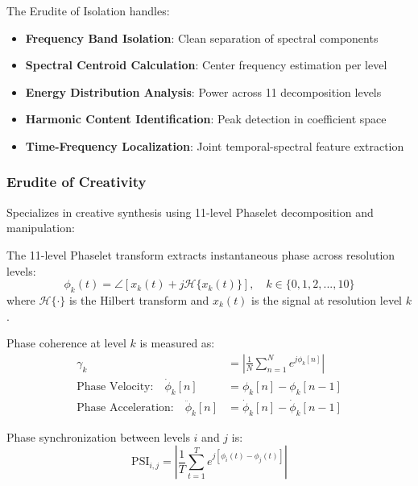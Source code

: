 The Erudite of Isolation handles:
\begin{itemize}
    \item \textbf{Frequency Band Isolation}: Clean separation of spectral components
    \item \textbf{Spectral Centroid Calculation}: Center frequency estimation per level
    \item \textbf{Energy Distribution Analysis}: Power across 11 decomposition levels
    \item \textbf{Harmonic Content Identification}: Peak detection in coefficient space
    \item \textbf{Time-Frequency Localization}: Joint temporal-spectral feature extraction
\end{itemize}

\subsubsection{Erudite of Creativity}
Specializes in creative synthesis using 11-level Phaselet decomposition and manipulation:

\begin{definition}
The 11-level Phaselet transform extracts instantaneous phase across resolution levels:
\begin{equation}
\phi_k(t) = \angle[x_k(t) + j \mathcal{H}\{x_k(t)\}], \quad k \in \{0,1,2,...,10\}
\end{equation}
where $\mathcal{H}\{\cdot\}$ is the Hilbert transform and $x_k(t)$ is the signal at resolution level $k$.
\end{definition}

\begin{definition}
Phase coherence at level $k$ is measured as:
\begin{align}
\gamma_k &= \left|\frac{1}{N}\sum_{n=1}^{N} e^{j\phi_k[n]}\right| \\
\text{Phase Velocity:} \quad \dot{\phi}_k[n] &= \phi_k[n] - \phi_k[n-1] \\
\text{Phase Acceleration:} \quad \ddot{\phi}_k[n] &= \dot{\phi}_k[n] - \dot{\phi}_k[n-1]
\end{align}
\end{definition}

\begin{definition}
Phase synchronization between levels $i$ and $j$ is:
\begin{equation}
\text{PSI}_{i,j} = \left|\frac{1}{T}\sum_{t=1}^{T} e^{j[\phi_i(t) - \phi_j(t)]}\right|
\end{equation}
\end{definition}


